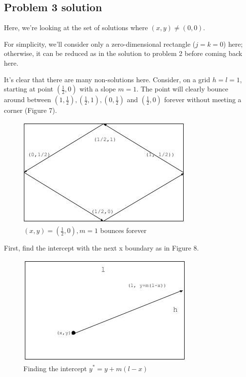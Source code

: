 \documentclass[11pt, oneside]{article} 	%
\begin{document}
\subsection{Problem 3 solution}

Here, we're looking at the set of solutions where $(x, y) \neq (0, 0)$.

For simplicity, we'll consider only a zero-dimensional rectangle ($j = k = 0$) here; otherwise, it can be reduced as in the solution to problem 2 before coming back here.

It's clear that there are many non-solutions here.  Consider, on a grid $h = l = 1$, starting at point $(\frac{1}{2}, 0)$ with a slope $m = 1$.  The point will clearly bounce around between $(1, \frac{1}{2}), (\frac{1}{2}, 1), (0, \frac{1}{2})$ and $ (\frac{1}{2}, 0)$ forever without meeting a corner (Figure 7).

\begin{figure}[!htb]
\centering
\includegraphics[scale=.4]{bounceforever}
\caption{$(x, y) = (\frac{1}{2}, 0), m = 1$ bounces forever}
\end{figure}

First, find the intercept with the next x boundary as in Figure 8.

\begin{figure}[!htb]
\centering
\includegraphics[scale=.4]{intercept}
\caption{Finding the intercept $y^* = y + m(l-x)$}
\end{figure}
\end{document}
